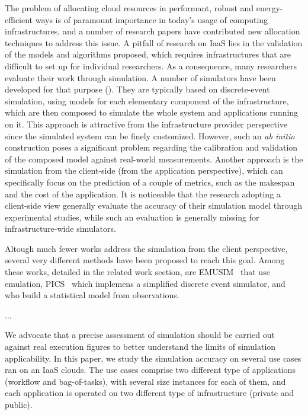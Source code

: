 



The  problem   of  allocating   cloud  resources   in  performant,   robust  and
energy-efficient ways is  of paramount importance in today's  usage of computing
infrastructures, and a number of research papers have contributed new allocation
techniques to  address this issue.   A pitfall of research  on IaaS lies  in the
validation of the models and algorithms proposed, which requires infrastructures
that are difficult to set up for individual researchers.  As a consequence, many
researchers evaluate their work through  simulation. A number of simulators have
been  developed for  that purpose  (\cite{9-14}).  They  are typically  based on
discrete-event simulation,  using models  for each  elementary component  of the
infrastructure,  which  are then  composed  to  simulate  the whole  system  and
applications running on it.  This approach is attractive from the infrastructure
provider  perspective  since the  simulated  system  can be  finely  customized.
However, such  an \textit{ab  initio} construction  poses a  significant problem
regarding  the  calibration  and  validation   of  the  composed  model  against
real-world  measurements.    Another  approach   is  the  simulation   from  the
client-side (from the application perspective),  which can specifically focus on
the prediction of a couple of metrics, such  as the makespan and the cost of the
application.  It  is noticeable  that the research  adopting a  client-side view
generally evaluate the  accuracy of their simulation  model through experimental
studies, while such  an evaluation is generally  missing for infrastructure-wide
simulators.

Altough much  fewer works  address the simulation  from the  client perspective,
several very  different methods have  been proposed  to reach this  goal.  Among
these    works,     detailed    in    the    related     work    section,    are
EMUSIM~\cite{CalheirosNRB13}  that  use   emulation,  PICS~\cite{KimWH15}  which
implemens  a simplified  discrete  event  simulator, and~\cite{PucherGWK15}  who
build a statistical model from observations.

...


We advocate  that a precise assessment  of simulation
should be  carried out against real  execution figures to better  understand the
limits  of simulation  applicability. In  this  paper, we  study the  simulation
accuracy on several use cases ran on  an IaaS clouds. The use cases comprise two
different type  of applications (workflow  and bag-of-tasks), with  several size
instances for  each of them, and  each application is operated  on two different
type of infrastructure (private and public).


